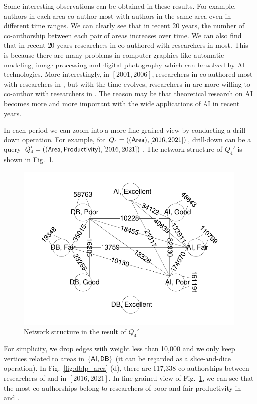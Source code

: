 \documentclass[10pt,journal,compsoc]{IEEEtran}
\begin{document}
Some interesting observations can be obtained in these results. For example, authors in each area co-author most with authors in the same area even in different time ranges. We can clearly see that in recent 20 years, the number of co-authorship between each pair of areas increases over time. We can also find that in recent 20 years researchers in  co-authored with researchers in  most. This is because there are many problems in computer graphics like automatic modeling, image processing and digital photography which can be solved by AI technologies. More interestingly, in $ [2001,2006] $, researchers in  co-authored most with researchers in , but with the time evolves, researchers in  are more willing to co-author with researchers in . The reason may be that theoretical research on AI becomes more and more important with the wide applications of AI in recent years. %

In each period we can zoom into a more fine-grained view by conducting a drill-down operation. For example, for $ Q_4=(({\mathsf{Area}}),[2016,2021]) $, drill-down can be a query $ Q_4'=(({\mathsf{Area}},{\mathsf{Productivity}}),[2016,2021]) $. The network structure of $ Q_4' $ is shown in Fig.~\ref{fig:dblp_area_pro_2016_2021}.
\begin{figure}
	\begin{center}
		\includegraphics[width=0.8\columnwidth]{fig/exp/visio_area_pro_2016_2021.pdf}
	\end{center}
	
	\vspace*{-0.6cm}
	\caption{Network structure in the result of $ Q_4' $}
	\vspace*{-0.4cm}
	\label{fig:dblp_area_pro_2016_2021}
\end{figure}
For simplicity, we drop edges with weight less than 10,000 and we only keep vertices related to areas in $ \{{\mathsf{AI}},{\mathsf{DB}}\} $ (it can be regarded as a slice-and-dice operation). In Fig.~\ref{fig:dblp_area} (d), there are 117,338 co-authorships between researchers of  and  in $ [2016,2021] $. In fine-grained view of Fig.~\ref{fig:dblp_area_pro_2016_2021}, we can see that the most co-authorships belong to researchers of poor and fair productivity in  and .
\end{document}
